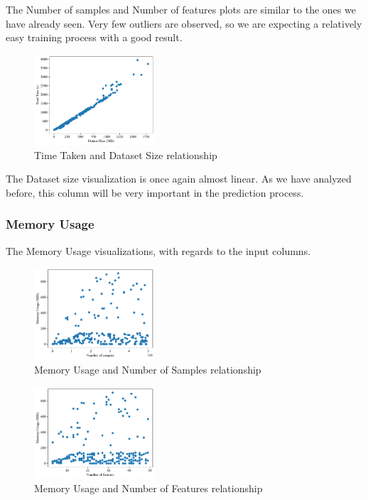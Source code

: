 \documentclass[conference]{IEEEtran}
\begin{document}
The Number of samples and Number of features plots are similar to the ones we have already seen. Very few outliers are observed, so we are expecting a relatively easy training process with a good result.

\begin{figure}[!h]
    \centering
\includegraphics[width=0.4\textwidth]{plots/experiment_results/word2vec_time_dataset_size.pdf}
    \caption{Time Taken and Dataset Size relationship}
\end{figure}

The Dataset size visualization is once again almost linear. As we have analyzed before, this column will be very important in the prediction process.

\vfill
\subsubsection{\textbf{Memory Usage}}
The Memory Usage visualizations, with regards to the input columns.

\begin{figure}[hb]
\centering
\includegraphics[width=0.4\textwidth]{plots/experiment_results/word2vec_memory_samples.pdf}
\caption{Memory Usage and Number of Samples relationship}
\end{figure}
 
\begin{figure}[ht]
    \centering
\includegraphics[width=0.4\textwidth]{plots/experiment_results/word2vec_memory_features.pdf}
\caption{Memory Usage and Number of Features relationship}
\end{figure}
\end{document}
